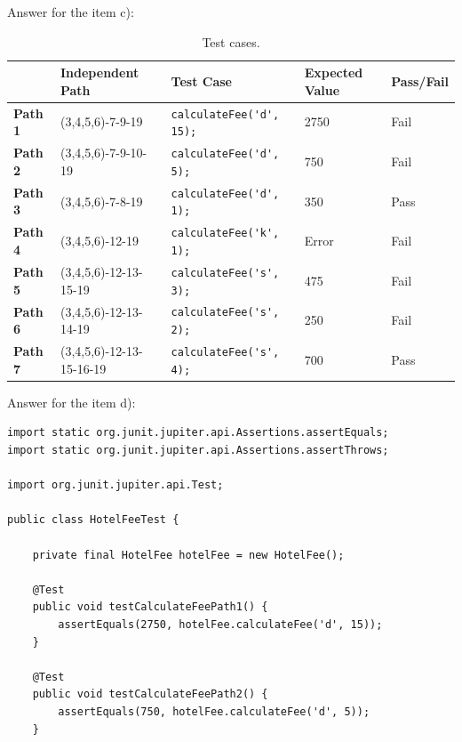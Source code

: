 \begin{solution}
    Answer for the item c):
    
    \begin{table}[H]
        \centering
        \renewcommand{\arraystretch}{1.2}
        \caption{Test cases.}
        \label{tab:ex7-test-cases}
        \begin{adjustbox}{max width=\textwidth}
            \begin{tabular}{lllll}
                \toprule
                 & Independent Path & Test Case & Expected Value & Pass/Fail\\
                \midrule
                \textbf{Path 1} & (3,4,5,6)-7-9-19 & \lstinline!calculateFee('d', 15);! & 2750 & Fail\\
                \textbf{Path 2} & (3,4,5,6)-7-9-10-19 & \lstinline!calculateFee('d', 5);! & 750 & Fail\\
                \textbf{Path 3} & (3,4,5,6)-7-8-19 & \lstinline!calculateFee('d', 1);! & 350 & Pass\\
                \textbf{Path 4} & (3,4,5,6)-12-19 & \lstinline!calculateFee('k', 1);! & Error & Fail\\
                \textbf{Path 5} & (3,4,5,6)-12-13-15-19 & \lstinline!calculateFee('s', 3);! & 475 & Fail\\
                \textbf{Path 6} & (3,4,5,6)-12-13-14-19 & \lstinline!calculateFee('s', 2);! & 250 & Fail\\
                \textbf{Path 7} & (3,4,5,6)-12-13-15-16-19 & \lstinline!calculateFee('s', 4);! & 700 & Pass\\
                \bottomrule
            \end{tabular}
        \end{adjustbox}
    \end{table}
    
    Answer for the item d):
    
    \begin{lstlisting}
import static org.junit.jupiter.api.Assertions.assertEquals;
import static org.junit.jupiter.api.Assertions.assertThrows;

import org.junit.jupiter.api.Test;

public class HotelFeeTest {
	
	private final HotelFee hotelFee = new HotelFee();
	
	@Test
	public void testCalculateFeePath1() {
		assertEquals(2750, hotelFee.calculateFee('d', 15));
	}
	
	@Test
	public void testCalculateFeePath2() {
		assertEquals(750, hotelFee.calculateFee('d', 5));
	}
	

\end{lstlisting}
\end{solution}
